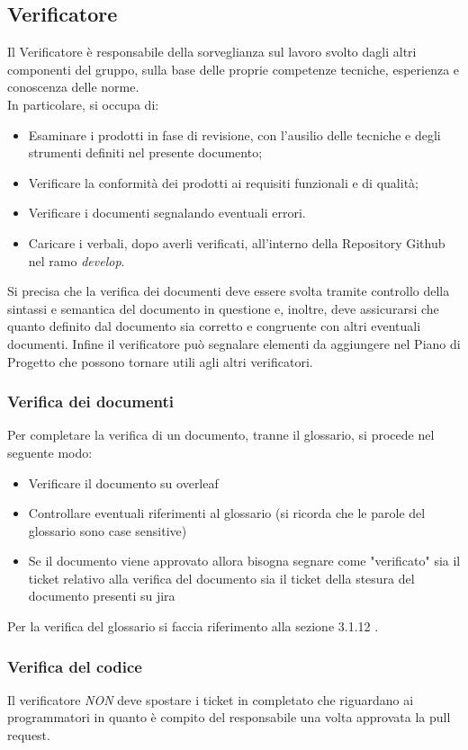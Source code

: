\subsection{Verificatore}
Il Verificatore è responsabile della sorveglianza sul lavoro svolto dagli altri componenti del gruppo, sulla base delle proprie competenze tecniche, esperienza e conoscenza delle norme. \\
In particolare, si occupa di:
\begin{itemize}
    \item Esaminare i prodotti in fase di revisione, con l'ausilio delle tecniche e degli strumenti definiti nel presente documento;
    \item Verificare la conformità dei prodotti ai requisiti funzionali e di qualità;
    \item Verificare i documenti segnalando eventuali errori.
    \item Caricare i verbali, dopo averli verificati, all'interno della Repository Github nel ramo \textit{develop}.
\end{itemize}
Si precisa che la verifica dei documenti deve essere svolta tramite controllo della sintassi e semantica del documento in questione e, inoltre, deve assicurarsi che quanto definito dal documento sia corretto e congruente con altri eventuali documenti.
Infine il verificatore può segnalare elementi da aggiungere nel Piano di Progetto che possono tornare utili agli altri verificatori. \\
\subsubsection{Verifica dei documenti}
Per completare la verifica di un documento, tranne il glossario, si procede nel seguente modo:
\begin{itemize}
    \item Verificare il documento su overleaf
    \item Controllare eventuali riferimenti al glossario (si ricorda che le parole del glossario sono case sensitive)
    \item Se il documento viene approvato allora bisogna segnare come "verificato" sia il ticket relativo alla verifica del documento sia il ticket della stesura del documento presenti su jira
\end{itemize}
Per la verifica del glossario si faccia riferimento alla sezione 3.1.12 .
\subsubsection{Verifica del codice}
Il verificatore \emph{NON} deve spostare i ticket in completato che riguardano ai programmatori in quanto è compito del responsabile una volta approvata la pull request.
